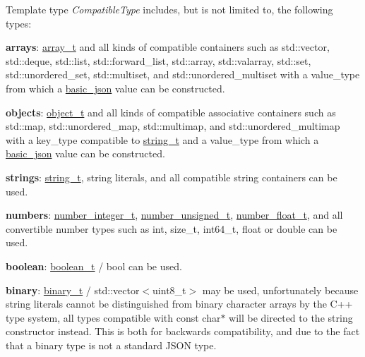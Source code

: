 Template type {\itshape Compatible\+Type} includes, but is not limited to, the following types\+:
\begin{DoxyItemize}
\item {\bfseries arrays}\+: \hyperlink{classnlohmann_1_1basic__json_a53700c308d804f84aea5ff05abb2ac4e}{array\+\_\+t} and all kinds of compatible containers such as {\ttfamily std\+::vector}, {\ttfamily std\+::deque}, {\ttfamily std\+::list}, {\ttfamily std\+::forward\+\_\+list}, {\ttfamily std\+::array}, {\ttfamily std\+::valarray}, {\ttfamily std\+::set}, {\ttfamily std\+::unordered\+\_\+set}, {\ttfamily std\+::multiset}, and {\ttfamily std\+::unordered\+\_\+multiset} with a {\ttfamily value\+\_\+type} from which a \hyperlink{classnlohmann_1_1basic__json}{basic\+\_\+json} value can be constructed.
\item {\bfseries objects}\+: \hyperlink{classnlohmann_1_1basic__json_a5e3df077f880583a96d74cd63e173cb2}{object\+\_\+t} and all kinds of compatible associative containers such as {\ttfamily std\+::map}, {\ttfamily std\+::unordered\+\_\+map}, {\ttfamily std\+::multimap}, and {\ttfamily std\+::unordered\+\_\+multimap} with a {\ttfamily key\+\_\+type} compatible to \hyperlink{classnlohmann_1_1basic__json_a33593865ffb1860323dcbd52425b90c8}{string\+\_\+t} and a {\ttfamily value\+\_\+type} from which a \hyperlink{classnlohmann_1_1basic__json}{basic\+\_\+json} value can be constructed.
\item {\bfseries strings}\+: \hyperlink{classnlohmann_1_1basic__json_a33593865ffb1860323dcbd52425b90c8}{string\+\_\+t}, string literals, and all compatible string containers can be used.
\item {\bfseries numbers}\+: \hyperlink{classnlohmann_1_1basic__json_a11e390944da90db83089eb2426a749d3}{number\+\_\+integer\+\_\+t}, \hyperlink{classnlohmann_1_1basic__json_ae09af9c23351b7245d9be4d1b2035fef}{number\+\_\+unsigned\+\_\+t}, \hyperlink{classnlohmann_1_1basic__json_a5b8abaebd922d82d69756327c0c347e6}{number\+\_\+float\+\_\+t}, and all convertible number types such as {\ttfamily int}, {\ttfamily size\+\_\+t}, {\ttfamily int64\+\_\+t}, {\ttfamily float} or {\ttfamily double} can be used.
\item {\bfseries boolean}\+: \hyperlink{classnlohmann_1_1basic__json_a44fd1a12c9c54623c942b430e7a72937}{boolean\+\_\+t} / {\ttfamily bool} can be used.
\item {\bfseries binary}\+: \hyperlink{classnlohmann_1_1basic__json_ad6c955145bebde84d93991ffed7cd389}{binary\+\_\+t} / {\ttfamily std\+::vector$<$uint8\+\_\+t$>$} may be used, unfortunately because string literals cannot be distinguished from binary character arrays by the C++ type system, all types compatible with {\ttfamily const char$\ast$} will be directed to the string constructor instead. This is both for backwards compatibility, and due to the fact that a binary type is not a standard J\+S\+ON type.
\end{DoxyItemize}

